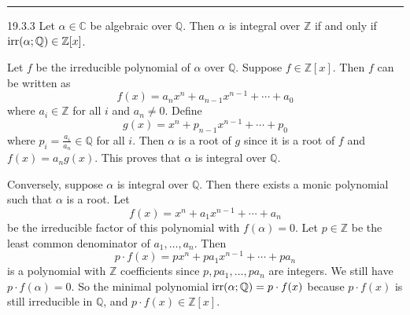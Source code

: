 \documentclass[a4paper, 12pt]{article}
\begin{document}
\noindent\rule{7in}{2.8pt}
\begin{problem}{19.3.3}
Let \(\alpha \in \mathbb{C}\) be algebraic over \(\mathbb{Q}\). Then \(\alpha\) is integral over \(\mathbb{Z}\) if and only if \(\text{irr}(\alpha;\mathbb{Q})\in \mathbb{Z}[x]\).
\end{problem}
\begin{solution}
Let \(f\) be the irreducible polynomial of \(\alpha\) over \(\mathbb{Q}\). Suppose \(f\in \mathbb{Z}[x]\). Then \(f\) can be written as 
\[f(x)=a_nx^n+a_{n-1}x^{n-1}+\cdots+a_0\]
where \(a_i\in \mathbb{Z}\) for all \(i\) and \(a_n\neq 0\). Define 
\[g(x)=x^n+p_{n-1}x^{n-1}+\cdots+p_0\]
where \(p_i=\frac{a_i}{a_n}\in \mathbb{Q}\) for all \(i\). Then \(\alpha\) is a root of \(g\) since it is a root of \(f\) and \(f(x)=a_n g(x)\). This proves that \(\alpha\) is integral over \(\mathbb{Q}\). 

Conversely, suppose \(\alpha\) is integral over \(\mathbb{Q}\). Then there exists a monic polynomial 
such that \(\alpha\) is a root. Let 
\[f(x)=x^n+a_1x^{n-1}+\cdots+a_n\] 
be the irreducible factor of this polynomial with \(f(\alpha)=0\). Let \(p\in \mathbb{Z}\) be the least common denominator of \(a_1,\ldots,a_n\). Then 
\[p\cdot f(x)=px^n+pa_1x^{n-1}+\cdots+pa_n\]
is a polynomial with \(\mathbb{Z}\) coefficients since \(p,pa_1,\ldots,pa_n\) are integers. We still have \(p\cdot f(\alpha)=0\). So the minimal polynomial \(\text{irr}(\alpha;\mathbb{Q})=p\cdot f(x)\) because \(p\cdot f(x)\) is still irreducible in \(\mathbb{Q}\), and \(p\cdot f(x)\in \mathbb{Z}[x]\).
\end{solution}
\end{document}
